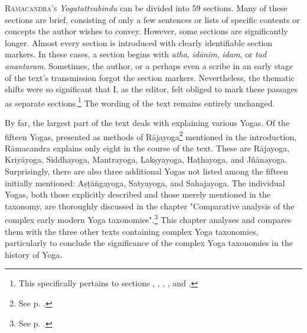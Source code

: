 \lettrine[lines=2, lhang=0.2, loversize=0.25]{R}{āmacandra's} \emph{Yogatattvabindu} can be divided into 59 sections. Many of these sections are brief, consisting of only a few sentences or lists of specific contents or concepts the author wishes to convey. However, some sections are significantly longer. Almost every section is introduced with clearly identifiable section markers. In these cases, a section begins with \textit{atha}, \textit{idānīm}, \textit{idam}, or \textit{tad anantaram}. Sometimes, the author, or a perhaps even a scribe in an early stage of the text's transmission forgot the section markers. Nevertheless, the thematic shifts were so significant that I, as the editor, felt obliged to mark these passages as separate sections.\footnote{This specifically pertains to sections , , , , and .} The wording of the text remains entirely unchanged.

By far, the largest part of the text deals with explaining various Yogas. Of the fifteen Yogas, presented as methods of Rājayoga\footnote{See p. \pageref{into}.} mentioned in the introduction, Rāmacandra explains only eight in the course of the text. These are Rājayoga, Kriyāyoga, Siddhayoga, Mantrayoga, Lakṣyayoga, Haṭhayoga, and Jñānayoga. Surprisingly, there are also three additional Yogas not listed among the fifteen initially mentioned: Aṣṭāṅgayoga, Satyayoga, and Sahajayoga. The individual Yogas, both those explicitly described and those merely mentioned in the taxonomy, are thoroughly discussed in the chapter "Comparative analysis of the complex early modern Yoga taxonomies".\footnote{See p. \pageref{yogatax}.} This chapter analyses and compares them with the three other texts containing complex Yoga taxonomies, particularly to conclude the significance of the complex Yoga taxonomies in the history of Yoga.

